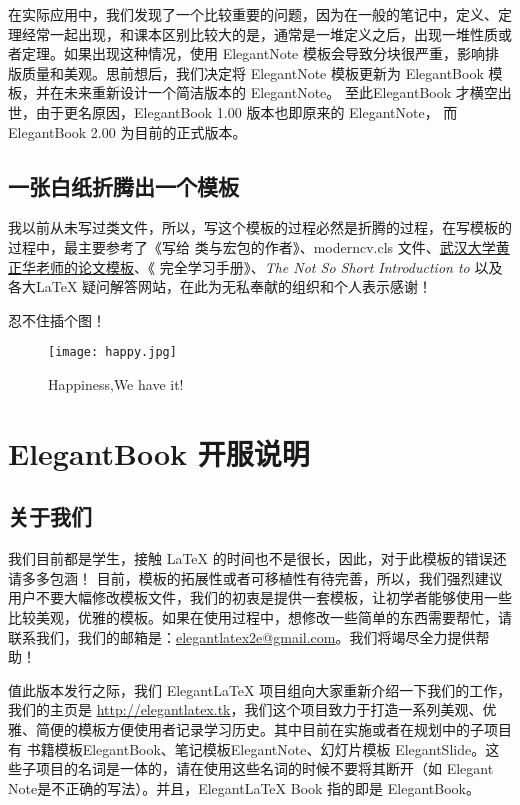 \documentclass[color=green,mathpazo,titlestyle=hang]{elegantbook}
\begin{document}
在实际应用中，我们发现了一个比较重要的问题，因为在一般的笔记中，定义、定理经常一起出现，和课本区别比较大的是，通常是一堆定义之后，出现一堆性质或者定理。如果出现这种情况，使用 ElegantNote 模板会导致分块很严重，影响排版质量和美观。思前想后，我们决定将 ElegantNote 模板更新为 ElegantBook 模板，并在未来重新设计一个简洁版本的 ElegantNote。 至此ElegantBook 才横空出世，由于更名原因，ElegantBook 1.00 版本也即原来的 ElegantNote， 而ElegantBook 2.00 为目前的正式版本。

\section{一张白纸折腾出一个模板}

我以前从未写过类文件，所以，写这个模板的过程必然是折腾的过程，在写模板的过程中，最主要参考了《写给\LaTeXe{} 类与宏包的作者》\cite{packagewriter}、moderncv.cls 文件、\href{http://aff.whu.edu.cn/huangzh/}{武汉大学黄正华老师的论文模板}、《\LaTeXe{} 完全学习手册》\cite{complete}、{\itshape The Not So Short Introduction to \LaTeXe{}}\cite{oetiker2010not}以及各大\LaTeX{} 疑问解答网站，在此为无私奉献的组织和个人表示感谢！

{\color{thid}忍不住插个图！}

\begin{figure}[!hbtp]
\texttt{[image: happy.jpg]}
\caption{Happiness,We have it!\label{figur:happy}}
\end{figure}

\chapter{ElegantBook 开服说明}
\section{关于我们}
 我们目前都是学生，接触 \LaTeX{} 的时间也不是很长，因此，对于此模板的错误还请多多包涵！ 目前，模板的拓展性或者可移植性有待完善，所以，我们强烈建议用户不要大幅修改模板文件，我们的初衷是提供一套模板，让初学者能够使用一些比较美观，优雅的模板。如果在使用过程中，想修改一些简单的东西需要帮忙，请联系我们，我们的邮箱是：\href{elegantlatex2e@gmail.com}{elegantlatex2e@gmail.com}。我们将竭尽全力提供帮助！
 
值此版本发行之际，我们 Elegant\LaTeX{} 项目组向大家重新介绍一下我们的工作，我们的主页是 \url{http://elegantlatex.tk}，我们这个项目致力于打造一系列美观、优雅、简便的模板方便使用者记录学习历史。其中目前在实施或者在规划中的子项目有 书籍模板ElegantBook、笔记模板ElegantNote、幻灯片模板 ElegantSlide。这些子项目的名词是一体的，请在使用这些名词的时候不要将其断开（如 Elegant Note是不正确的写法）。并且，Elegant\LaTeX{}  Book 指的即是 ElegantBook。
\end{document}
